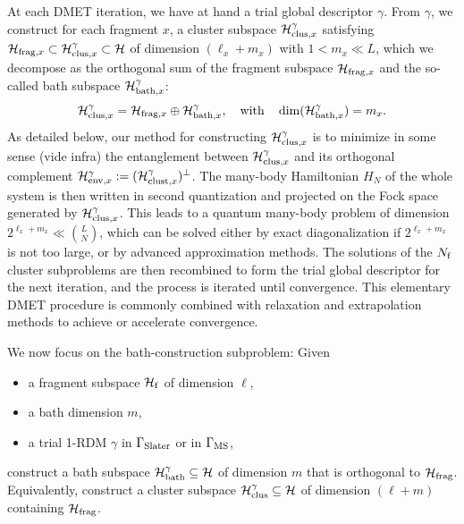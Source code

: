 \documentclass{article}
\newcommand{\1}{{\mathds 1}}
\begin{document}
At each DMET iteration, we have at hand a trial global descriptor $\gamma$. From $\gamma$, we construct for each fragment $x$, a cluster subspace $ \mathcal H_{{\rm clus},x}^\gamma$ satisfying $\mathcal H_{{\rm frag},x} \subset \mathcal H_{{\rm clus},x}^\gamma \subset \mathcal H$ of dimension $(\ell_x+m_x)$ with $1 < m_x \ll L$, which we decompose as the orthogonal sum of the fragment subspace $\mathcal H_{{\rm frag},x}$ and the so-called {\rm bath} subspace $\mathcal H_{{\rm bath},x}^\gamma$:
$$
\mathcal H_{{\rm clus},x}^\gamma = \mathcal H_{{\rm frag},x} \oplus \mathcal H_{{\rm bath},x}^\gamma, \quad \mbox{with} \quad \dim(\mathcal H_{{\rm bath},x}^\gamma)=m_x.
$$
As detailed below, our method for constructing $\mathcal H_{{\rm clus},x}^\gamma$ is to minimize in some sense (vide infra) the entanglement between  $\mathcal H_{{\rm clus},x}^\gamma$ and its orthogonal complement $\mathcal{H}_{{\rm env},x}^\gamma := (\mathcal{H}_{{\rm clust},x}^\gamma)^\perp$.
The many-body Hamiltonian $H_N$ of the whole system is then written in second quantization and projected on the Fock space generated by $\mathcal H_{{\rm clus},x}^\gamma$. This leads to a quantum many-body problem of dimension $2^{\ell_x+m_x} \ll {L \choose N}$, which can be solved either by exact diagonalization if $2^{\ell_x+m_x}$ is not too large, or by advanced approximation methods. The solutions of the $N_{\rm f}$ cluster subproblems are then recombined to form the trial global descriptor for the next iteration, and the process is iterated until convergence. This elementary DMET procedure is commonly combined with relaxation and extrapolation methods to achieve or accelerate convergence.

\medskip

We now focus on the bath-construction subproblem: Given 
\begin{itemize}
    \item[(i)] a fragment subspace $\mathcal H_{\rm f}$ of dimension $\ell$,\vspace{-2mm}
    \item[(ii)] a bath dimension $m$,\vspace{-2mm}
    \item[(iii)] a trial  1-RDM $\gamma$ in ${\Gamma}_{\rm Slater}$ or in ${\Gamma}_{\rm MS}$,
\end{itemize}
construct a bath subspace $\mathcal H_{{\rm bath}}^\gamma \subseteq \mathcal H$ of dimension $m$ that is orthogonal to $\mathcal H_{\rm frag}$. Equivalently, construct a cluster subspace $\mathcal H_{{\rm clus}}^\gamma \subseteq \mathcal H$ of dimension $(\ell+m)$ containing $\mathcal H_{\rm frag}$.
\end{document}
